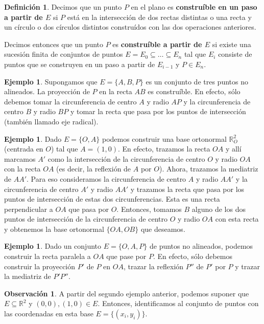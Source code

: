 \documentclass[12pt]{book}
\theoremstyle{definition}
\newtheorem{obs}[teo]{Observación}
\newtheorem{defn}[teo]{Definición}
\newtheorem{ex}[teo]{Ejemplo}
\newcommand{\RR}{\mathbb{R}}      %
\begin{document}
\begin{defn}
Decimos que un punto $P$ en el plano es \textbf{construíble en un paso a partir de $E$} si $P$ está en la intersección de dos rectas distintas o una recta y un círculo o dos círculos distintos construídos con las dos operaciones anteriores.

Decimos entonces que un punto $P$ es \textbf{construíble a partir de $E$} si existe una sucesión finita de conjuntos de puntos $E=E_0\subseteq\ldots \subseteq E_n$ tal que $E_i$ consiste de puntos que se construyen en un paso a partir de $E_{i-1}$ y $P\in E_n$.
\end{defn}

\begin{ex}
Supongamos que $E=\{A,B,P\}$ es un conjunto de tres puntos no alineados. La proyección de $P$ en la recta $AB$ es construíble. En efecto, sólo debemos tomar la circunferencia de centro $A$ y radio $AP$ y la circunferencia de centro $B$ y radio $BP$ y tomar la recta que pasa por los puntos de intersección (también llamado eje radical).
\end{ex}

\begin{ex}
Dado $E=\{O,A\}$ podemos construir una base ortonormal $\RR_O^2$ (centrada en $O$) tal que $A=(1,0)$. En efecto, trazamos la recta $OA$ y allí marcamos $A'$ como la intersección de la circunferencia de centro $O$ y radio $OA$ con la recta $OA$ (es decir, la reflexión de $A$ por $O$). Ahora, trazamos la mediatriz de $AA'$. Para eso consideramos la circunferencia de centro $A$ y radio $AA'$ y la circunferencia de centro $A'$ y radio $AA'$ y trazamos la recta que pasa por los puntos de intersección de estas dos circunferencias. Esta es una recta perpendicular a $OA$ que pasa por $O$. Entonces, tomamos $B$ alguno de los dos puntos de intersección de la circunferencia de centro $O$ y radio $OA$ con esta recta y obtenemos la base ortonormal $\{OA,OB\}$ que deseamos.
\end{ex}

\begin{ex}
Dado un conjunto $E=\{O,A,P\}$ de puntos no alineados, podemos construir la recta paralela a $OA$ que pase por $P$. En efecto, sólo debemos construir la proyección $P'$ de $P$ en $OA$, trazar la reflexión $P''$ de $P'$ por $P$ y trazar la mediatriz de $P'P''$.
\end{ex}

\begin{obs}
A partir del segundo ejemplo anterior, podemos suponer que $E\subseteq\RR^2$ y $(0,0),(1,0)\in E$. Entonces, identificamos al conjunto de puntos con las coordenadas en esta base $E=\{(x_i,y_i)\}$.
\end{obs}
\end{document}
